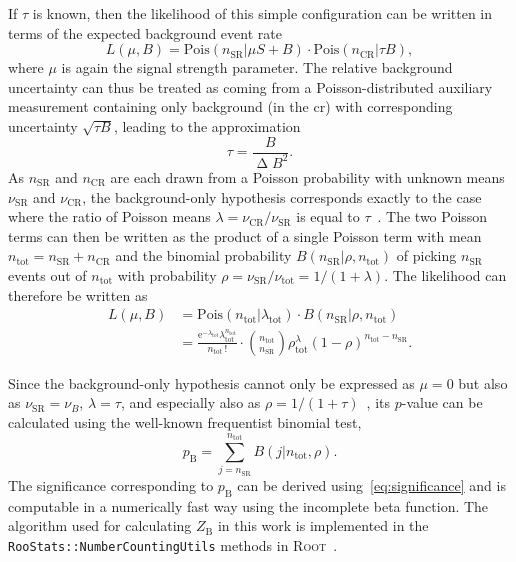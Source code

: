 If $\tau$ is known, then the likelihood of this simple configuration can be written in terms of the expected background event rate
\begin{equation}
	L (\mu,B) = \mathrm{Pois}(n_{\mathrm{SR}}\vert\mu S + B) \cdot \mathrm{Pois}(n_{\mathrm{CR}}\vert\tau B),
\end{equation} 
where $\mu$ is again the signal strength parameter. The relative background uncertainty can thus be treated as coming from a Poisson-distributed auxiliary measurement containing only background (\ie in the \gls{cr}) with corresponding uncertainty $\sqrt{\tau B}$, leading to the approximation
\begin{equation}
	\tau = \frac{B}{\upDelta B^2}.
\end{equation}
As $n_{\mathrm{SR}}$ and $n_{\mathrm{CR}}$ are each drawn from a Poisson probability with unknown means $\nu_\mathrm{SR}$ and $\nu_\mathrm{CR}$, the background-only hypothesis corresponds exactly to the case where the ratio of Poisson means \mbox{$\lambda = \nu_\mathrm{CR} / \nu_\mathrm{SR}$} is equal to $\tau$~\cite{Cousins:2007bmb}. The two Poisson terms can then be written as the product of a single Poisson term with mean $n_\mathrm{tot} = n_\mathrm{SR} + n_\mathrm{CR}$ and the binomial probability $B(n_\mathrm{SR}\vert\rho,n_\mathrm{tot})$ of picking $n_\mathrm{SR}$ events out of $n_\mathrm{tot}$ with probability $\rho = \nu_\mathrm{SR} / \nu_\mathrm{tot} = 1 / (1+\lambda)$. The likelihood can therefore be written as
\begin{equation}
\begin{split}
	L(\mu, B) & = \mathrm{Pois} (n_\mathrm{tot}\vert\lambda_\mathrm{tot})\cdot B(n_\mathrm{SR}\vert\rho,n_\mathrm{tot}) \\ 
	& = \frac{\mathrm{e}^{-\lambda_\mathrm{tot}}\lambda_{\mathrm{tot}}^{n_\mathrm{tot}}}{n_\mathrm{tot}\,!} \cdot{n_\mathrm{tot}\choose n_\mathrm{SR}} \rho^\lambda_\mathrm{tot} (1-\rho)^{n_\mathrm{tot}-n_\mathrm{SR}}.
\end{split}
\end{equation}

Since the background-only hypothesis cannot only be expressed as $\mu = 0$ but also as $\nu_\mathrm{SR} = \nu_B$, $\lambda = \tau$, and especially also as $\rho = 1/(1+\tau)$~\cite{Cousins:2007bmb}, its $p$-value can be calculated using the well-known frequentist binomial test,
\begin{equation}
	p_\mathrm{B} = \sum_{j=n_\mathrm{SR}}^{n_\mathrm{tot}} B (j\vert n_\mathrm{tot}, \rho).
\end{equation}
The significance corresponding to $p_\mathrm{B}$ can be derived using~\cref{eq:significance} and is computable in a numerically fast way using the incomplete beta function. The algorithm used for calculating $Z_\mathrm{B}$ in this work is implemented in the \texttt{RooStats::NumberCountingUtils} methods in \textsc{Root}~\cite{ROOT:1997pa,ROOT-2}.



